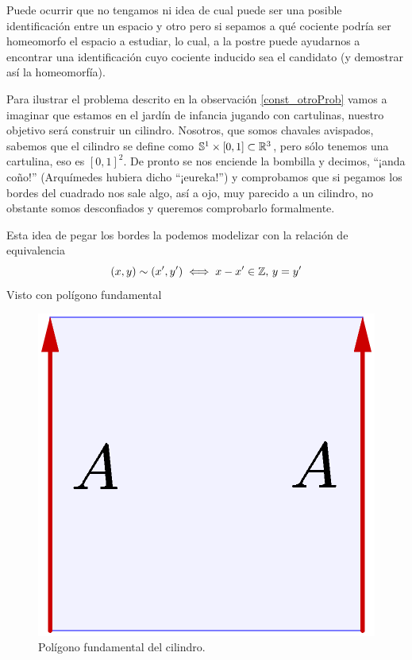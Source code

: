 \begin{obs}
	\label{const_otroProb}
	Puede ocurrir que no tengamos ni idea de cual puede ser una posible identificación entre un espacio y otro pero si sepamos a qué cociente podría ser homeomorfo el espacio a estudiar, lo cual, a la postre puede ayudarnos a encontrar una identificación cuyo cociente inducido sea el candidato (y demostrar así la homeomorfía).
\end{obs}
\begin{exa}[Cilindro]
	Para ilustrar el problema descrito en la observación \ref{const_otroProb} vamos a imaginar que estamos en el jardín de infancia jugando con cartulinas, nuestro objetivo será construir un cilindro. Nosotros, que somos chavales avispados, sabemos que el cilindro se define como $\mathbb{S}^1\times[0,1]\subset\mathbb{R}^3$, pero sólo tenemos una cartulina, eso es $[0,1]^2$. De pronto se nos enciende la bombilla y decimos, ``¡anda coño!'' (Arquímedes hubiera dicho ``¡eureka!'') y comprobamos que si pegamos los bordes del cuadrado nos sale algo, así a ojo, muy parecido a un cilindro, no obstante somos desconfiados y queremos comprobarlo formalmente.
	
	Esta idea de pegar los bordes la podemos modelizar con la relación de equivalencia
	\[(x,y)\sim (x',y')\iff x-x'\in\mathbb{Z}\text{, }y=y'\]
	Visto con polígono fundamental
	\begin{figure}[h!]
		\centering
		\includegraphics[scale = 0.15]{img/pol_fun_cilindro}
		\caption{Polígono fundamental del cilindro.}
	\end{figure}
	

\end{exa}
